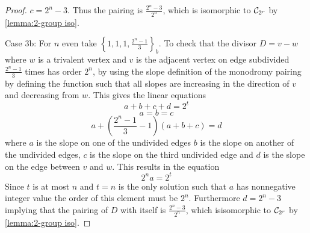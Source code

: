 \documentclass{amsart}
\begin{document}
\begin{proof}
$c=2^{n}-3$. Thus the pairing is $\frac{2^{n}-3}{2^{n}}$, which is
isomorphic to $\mathcal{C}_{2^{r}}$ by \ref{lemma:2-group iso}.

\begin{center}
\end{center}
    
Case 3b: For $n$ even take $\left\{1,1,1,
  \frac{2^{n}-1}{3}\right\}_{b}$. To check that the divisor $D=v-w$
where $w$ is a trivalent vertex and $v$ is the adjacent vertex on edge
subdivided $\frac{2^{n}-1}{3}$ times has order $2^{n}$, by using the
slope definition of the monodromy pairing by defining the function
such that all slopes are increasing in the direction of $v$ and
decreasing from $w$.  This gives the linear equations
\begin{equation*}
a+b+c+d=2^{t}
\end{equation*}
\begin{equation*}
a=b=c
\end{equation*}
\begin{equation*}
a+\left(\frac{2^{n}-1}{3}-1 \right)(a+b+c)=d
\end{equation*}
where $a$ is the slope on one of the undivided edges
$b$ is the slope on another of the undivided edges,  $c$ is the
slope on the third undivided edge and $d$ is the slope on
the edge between $v$ and $w$.
This results in the equation 
\begin{equation*}
2^na=2^t
\end{equation*}
Since $t$ is at most $n$ and $t=n$ is the only solution such that $a$ has nonnegative  integer value the order of this element must be $2^{n}$. Furthermore $d=2^{n}-3$ implying that the pairing of $D$ with itself is $\frac{2^{n}-3}{2^{n}}$, which isisomorphic to $\mathcal{C}_{2^{r}}$ by  \ref{lemma:2-group iso}.


\end{proof}
\end{document}
